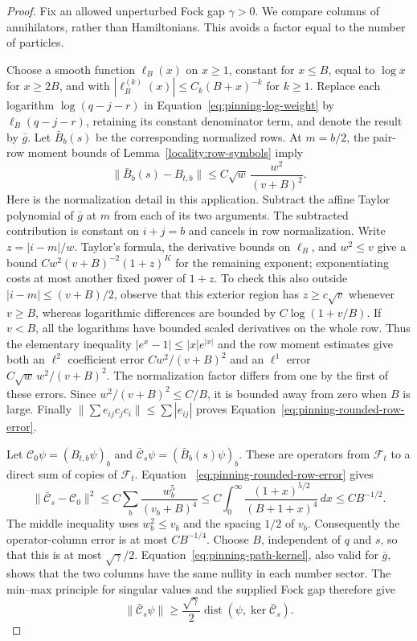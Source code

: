 \begin{proof}
Fix an allowed unperturbed Fock gap $\gamma>0$.  We compare columns of
annihilators, rather than Hamiltonians.  This avoids a factor equal to the
number of particles.

Choose a smooth function $\ell_B(x)$ on $x\ge1$, constant for $x\le B$,
equal to $\log x$ for $x\ge2B$, and with
$|\ell_B^{(k)}(x)|\le C_k(B+x)^{-k}$ for $k\ge1$.  Replace each logarithm
$\log(q-j-r)$ in Equation~\eqref{eq:pinning-log-weight} by
$\ell_B(q-j-r)$, retaining its constant denominator term, and denote the
result by $\bar g$.  Let $\bar B_b(s)$ be the corresponding normalized
rows.  At $m=b/2$, the pair-row moment bounds of
Lemma~\ref{locality:row-symbols} imply
\begin{equation}
 \|\bar B_b(s)-B_{t,b}\|
 \le C\sqrt w\,\frac{w^2}{(v+B)^2}.
 \label{eq:pinning-rounded-row-error}
\end{equation}
Here is the normalization detail in this application.  Subtract the affine
Taylor polynomial of $\bar g$ at $m$ from each of its two arguments.  The
subtracted contribution is constant on $i+j=b$ and cancels in row
normalization.  Write $z=|i-m|/w$.  Taylor's formula, the derivative bounds
on $\ell_B$, and $w^2\le v$ give a bound
$Cw^2(v+B)^{-2}(1+z)^K$ for the remaining exponent; exponentiating costs
at most another fixed power of $1+z$.  To check this also outside
$|i-m|\le(v+B)/2$, observe that this exterior region has
$z\ge c\sqrt v$ whenever $v\ge B$, whereas logarithmic differences are
bounded by $C\log(1+v/B)$.  If $v<B$, all the logarithms have bounded
scaled derivatives on the whole row.  Thus the elementary inequality
$|e^x-1|\le |x|e^{|x|}$ and the row moment estimates give both an
$\ell^2$ coefficient error $Cw^2/(v+B)^2$ and an $\ell^1$ error
$C\sqrt w\,w^2/(v+B)^2$.  The normalization factor differs from one by
the first of these errors.  Since $w^2/(v+B)^2\le C/B$, it is bounded
away from zero when $B$ is large.  Finally
$\|\sum e_{ij}c_jc_i\|\le\sum|e_{ij}|$ proves
Equation~\eqref{eq:pinning-rounded-row-error}.

Let $\mathcal C_0\psi=(B_{t,b}\psi)_b$ and
$\bar{\mathcal C}_s\psi=(\bar B_b(s)\psi)_b$.  These are operators from
$\mathcal F_t$ to a direct sum of copies of $\mathcal F_t$.  Equation~
\eqref{eq:pinning-rounded-row-error} gives
\begin{equation}
 \|\bar{\mathcal C}_s-\mathcal C_0\|^2
 \le C\sum_b\frac{w_b^5}{(v_b+B)^4}
 \le C\int_0^\infty\frac{(1+x)^{5/2}}{(B+1+x)^4}\,dx
 \le C B^{-1/2}.
 \label{eq:pinning-column-error}
\end{equation}
The middle inequality uses $w_b^2\le v_b$ and the spacing $1/2$ of
$v_b$.  Consequently the operator-column error is at most $CB^{-1/4}$.
Choose $B$, independent of $q$ and $s$, so that this is at most
$\sqrt\gamma/2$.  Equation~\eqref{eq:pinning-path-kernel}, also valid
for $\bar g$, shows that the two columns have the same nullity in each
number sector.  The min--max principle for singular values and the
supplied Fock gap therefore give
\[
 \|\bar{\mathcal C}_s\psi\|
 \ge\frac{\sqrt\gamma}{2}
       \operatorname{dist}(\psi,\ker\bar{\mathcal C}_s).
\]


\end{proof}
